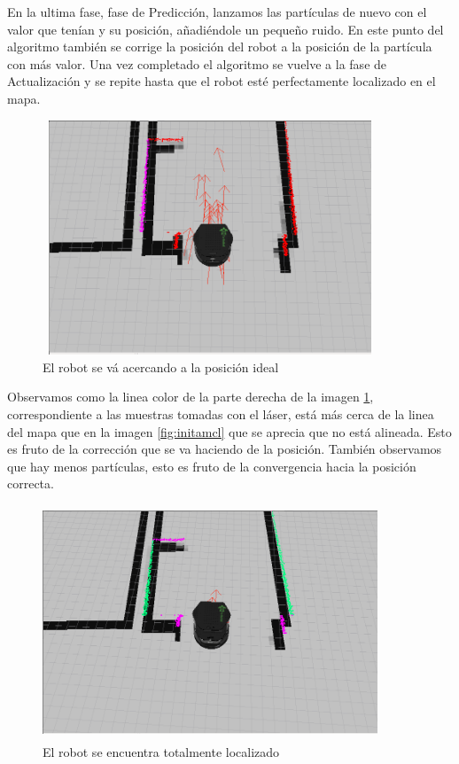 En la ultima fase, fase de Predicción, lanzamos las partículas de nuevo con el valor que tenían y su posición, añadiéndole un pequeño ruido.
En este punto del algoritmo también se corrige la posición del robot a la posición de la partícula con más valor.
Una vez completado el algoritmo se vuelve a la fase de Actualización y se repite hasta que el robot esté perfectamente localizado en el 
mapa.

\begin{figure}[hbtp]
  \begin{center}
    \includegraphics[width=10cm,height=7cm]{img/cap3/actamcl}
  \end{center}
  \caption{El robot se vá acercando a la posición ideal}
  \label{fig:actamcl}
\end{figure}

Observamos como la linea color de la parte derecha de la imagen \ref{fig:actamcl}, correspondiente a las muestras tomadas con el láser, está más cerca de la linea del mapa que en la imagen \ref{fig:initamcl} que se aprecia que no está alineada. Esto es fruto de la corrección que se va haciendo de la posición. También observamos que hay menos partículas, esto es fruto de la convergencia hacia la posición correcta.

\begin{figure}[hbtp]
  \begin{center}
    \includegraphics[width=10cm,height=7cm]{img/cap3/finamcl}
  \end{center}
  \caption{El robot se encuentra totalmente localizado}
  \label{fig:finamcl}
\end{figure}

